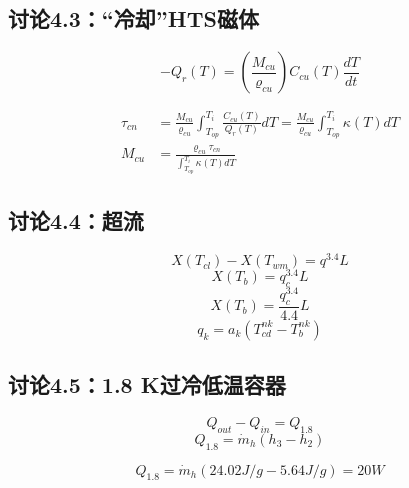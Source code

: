 \subsection{讨论4.3：“冷却”HTS磁体}
\begin{equation}%
-Q_r(T)=(\frac{M_{cu}}{\varrho_{cu}})C_{cu}(T)\frac{dT}{dt}
\end{equation}

\begin{subequations}%
\begin{align}
\tau_{cn}&=\frac{M_{cu}}{\varrho_{cu}}\int_{T_{op}}^{T_i}\frac{C_{cu}(T)}{Q_r(T)}dT=\frac{M_{cu}}{\varrho_{cu}}\int_{T_{op}}^{T_i}\kappa(T)dT\\
M_{cu}&=\frac{\varrho_{cu}\tau_{cn}}{\int_{T_{op}}^{T_i}\kappa(T)dT}
\end{align}
\end{subequations}



\subsection{讨论4.4：超流}


\begin{equation}%
X(T_{cl})-X(T_{wm})=q^{3.4}L
\end{equation}
\begin{equation}%
X(T_b)=q_{c}^{3.4}L
\end{equation}
\begin{equation}%
X(T_b)=\frac{q_{c}^{3.4}}{4.4}L
\end{equation}
\begin{equation}%
q_k=a_k(T_{cd}^{nk}-T_{b}^{nk})
\end{equation}

\subsection{讨论4.5：1.8 K过冷低温容器}

\begin{equation}%
Q_{out}-Q_{in}=Q_{1.8}
\end{equation}
\begin{equation}%
Q_{1.8}=\dot{m}_h(h_3-h_2)
\end{equation}

\begin{equation*}%
Q_{1.8}=\dot{m}_h(24.02J/g-5.64J/g)=20W
\end{equation*}

